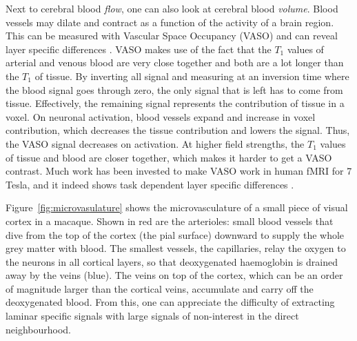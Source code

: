 Next to cerebral blood \emph{flow}, one can also look at cerebral blood \emph{volume}. Blood vessels may dilate and contract as a function of the activity of a brain region. This can be measured with Vascular Space Occupancy (VASO) \cite{Lu2003} and can reveal layer specific differences \cite{Zhao2006,Huber2018}. VASO makes use of the fact that the $T_1$ values of arterial and venous blood are very close together and both are a lot longer than the $T_1$ of tissue. By inverting all signal and measuring at an inversion time where the blood signal goes through zero, the only signal that is left has to come from tissue. Effectively, the remaining signal represents the contribution of tissue in a voxel. On neuronal activation, blood vessels expand and increase in voxel contribution, which decreases the tissue contribution and lowers the signal. Thus, the VASO signal decreases on activation. At higher field strengths, the $T_1$ values of tissue and blood are closer together, which makes it harder to get a VASO contrast. Much work has been invested to make VASO work in human fMRI for 7 Tesla, and it indeed shows task dependent layer specific differences \cite{Huber2017}.

Figure~\ref{fig:microvasulature} shows the microvasculature of a small piece of visual cortex in a macaque. Shown in red are the arterioles: small blood vessels that dive from the top of the cortex (the pial surface) downward to supply the whole grey matter with blood. The smallest vessels, the capillaries, relay the oxygen to the neurons in all cortical layers, so that deoxygenated haemoglobin is drained away by the veins (blue). The veins on top of the cortex, which can be an order of magnitude larger than the cortical veins, accumulate and carry off the deoxygenated blood. From this, one can appreciate the difficulty of extracting laminar specific signals with large signals of non-interest in the direct neighbourhood.


